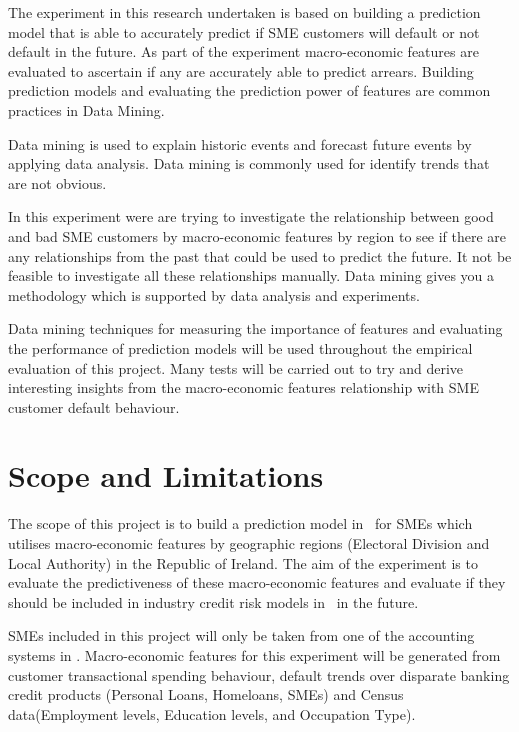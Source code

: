 The experiment in this research undertaken is based on building a prediction model that is able to accurately predict if SME customers will default or not default in the future. As part of the experiment macro-economic features are evaluated to ascertain if any are accurately able to predict arrears. Building prediction models and evaluating the prediction power of features are common practices in Data Mining.

Data mining is used to explain historic events and forecast future events by applying data analysis. Data mining is commonly used for identify trends that are not obvious. 

In this experiment were are trying to investigate the relationship between good and bad SME customers by macro-economic features by region to see if there are any relationships from the past that could be used to predict the future. It not be feasible to investigate all these relationships manually. Data mining gives you a methodology which is supported by data analysis and experiments. 

Data mining techniques for measuring the importance of features and evaluating the performance of prediction models will be used throughout the empirical evaluation of this project. Many tests will be carried out to try and derive interesting insights from the macro-economic features relationship with SME customer default behaviour.

\section{Scope and Limitations}
The scope of this project is to build a prediction model in \subjectname\ for SMEs which utilises macro-economic features by geographic regions (Electoral Division and Local Authority) in the Republic of Ireland. The aim of the experiment is to evaluate the predictiveness of these macro-economic features and evaluate if they should be included in industry credit risk models in \subjectname\ in the future.

SMEs included in this project will only be taken from one of the accounting systems in \subjectname. Macro-economic features for this experiment will be generated from customer transactional spending behaviour, default trends over disparate banking credit products (Personal Loans, Homeloans, SMEs) and Census data(Employment levels, Education levels, and Occupation Type). 

